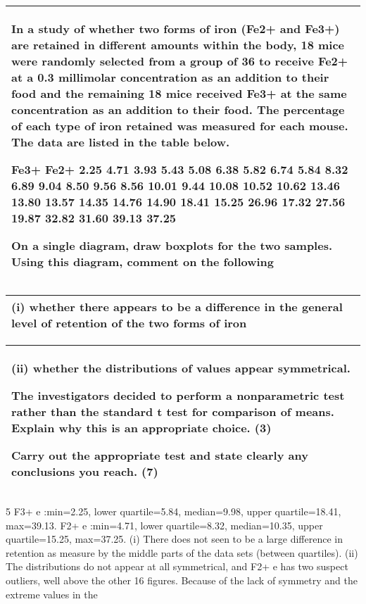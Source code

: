\documentclass[a4paper,12pt]{article}
\begin{document}
\begin{table}[ht!]
 \centering
 \begin{tabular}{|p{15cm}|}
 \hline  
In a study of whether two forms of iron (Fe2+ and Fe3+) are retained in different amounts within the body, 18 mice were randomly selected from a group of 36 to receive Fe2+ at a 0.3 millimolar concentration as an addition to their food and the remaining 18 mice received Fe3+ at the same concentration as an addition to their food.  The percentage of each type of iron retained was measured for each mouse. The data are listed in the table below. 
 
Fe3+ Fe2+ 2.25 4.71 3.93 5.43 5.08 6.38 5.82 6.74 5.84 8.32 6.89 9.04 8.50 9.56 8.56 10.01 9.44 10.08 10.52 10.62 13.46 13.80 13.57 14.35 14.76 14.90 18.41 15.25 26.96 17.32 27.56 19.87 32.82 31.60 39.13 37.25 
 
On a single diagram, draw boxplots for the two samples.  Using this diagram, comment on the following
 


\\ \hline
  \end{tabular}
\end{table}

\begin{table}[ht!]
 \centering
 \begin{tabular}{|p{15cm}|}
 \hline  
 (i) whether there appears to be a difference in the general level of retention of the two forms of iron 
 \\ \hline
  \end{tabular}
\end{table}


\begin{table}[ht!]
 \centering
 \begin{tabular}{|p{15cm}|}
 \hline  
 
 (ii) whether the distributions of values appear symmetrical. 

 
The investigators decided to perform a nonparametric test rather than the standard t test for comparison of means.  Explain why this is an appropriate choice. (3) 
 
Carry out the appropriate test and state clearly any conclusions you reach. 
(7) \\ \hline
  \end{tabular}
\end{table}

5 F3+
e :min=2.25, lower quartile=5.84, median=9.98, upper quartile=18.41, max=39.13.
F2+
e :min=4.71, lower quartile=8.32, median=10.35, upper quartile=15.25, max=37.25.
(i) There does not seen to be a large difference in retention as measure by the middle parts
of the data sets (between quartiles).
(ii) The distributions do not appear at all symmetrical, and F2+
e has two suspect outliers, well
above the other 16 figures. Because of the lack of symmetry and the extreme values in the
\end{document}
